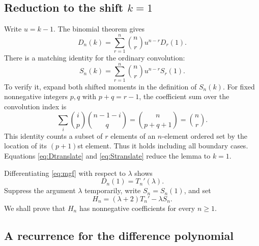 \documentclass[11pt]{article}
\numberwithin{equation}{section}
\theoremstyle{definition}
\theoremstyle{remark}
\begin{document}
\subsection{Reduction to the shift \texorpdfstring{$k=1$}{k=1}}

Write $u=k-1$. The binomial theorem gives
\begin{equation}\label{eq:Dtranslate}
 D_n(k)=\sum_{r=1}^n\binom nr u^{n-r}D_r(1).
\end{equation}
There is a matching identity for the ordinary convolution:
\begin{equation}\label{eq:Stranslate}
 S_n(k)=\sum_{r=1}^n\binom nr u^{n-r}S_r(1).
\end{equation}
To verify it, expand both shifted moments in the definition of $S_n(k)$.
For fixed nonnegative integers $p,q$ with $p+q=r-1$, the coefficient
sum over the convolution index is
\[
 \sum_i\binom ip\binom{n-1-i}q=\binom n{p+q+1}=\binom nr.
\]
This identity counts a subset of $r$ elements of an $n$-element ordered
set by the location of its $(p+1)$st element. Thus it holds including
all boundary cases. Equations \eqref{eq:Dtranslate} and
\eqref{eq:Stranslate} reduce the lemma to $k=1$.

Differentiating \eqref{eq:mgf} with respect to $\lambda$ shows
\begin{equation}\label{eq:Dderivative}
 D_n(1)=T_n'(\lambda).
\end{equation}
Suppress the argument $\lambda$ temporarily, write $S_n=S_n(1)$, and set
\begin{equation}\label{eq:H}
 H_n=(\lambda+2)T_n'-\lambda S_n.
\end{equation}
We shall prove that $H_n$ has nonnegative coefficients for every $n\ge1$.

\subsection{A recurrence for the difference polynomial}
\end{document}
